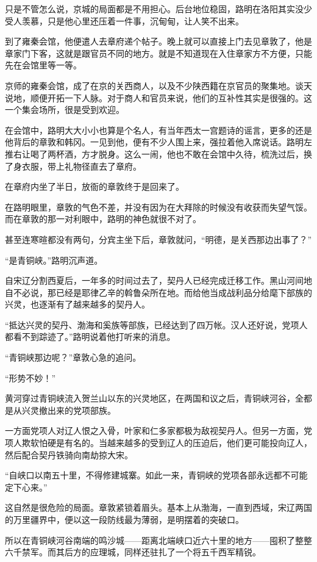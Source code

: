 只是不管怎么说，京城的局面都是不用担心。后台地位稳固，路明在洛阳其实没少受人羡慕，只是他心里还压着一件事，沉甸甸，让人笑不出来。 

到了雍秦会馆，他便遣人去章府递个帖子。晚上就可以直接上门去见章敦了，他是章家门下客，这就是跟官员不同的地方。就是不知道现在入住章家方不方便，只能先在会馆里等一等。 

京师的雍秦会馆，成了在京的关西商人，以及不少陕西籍在京官员的聚集地。谈天说地，顺便开拓一下人脉。对于商人和官员来说，他们的互补性其实是很强的。这一个集会场所，很是受到欢迎。 

在会馆中，路明大大小小也算是个名人，有当年西太一宫题诗的谣言，更多的还是他背后的章敦和韩冈。一见到他，便有不少人围上来，强拉着他入席说话。路明左推右让喝了两杯酒，方才脱身。这么一闹，他也不敢在会馆中久待，梳洗过后，换了身衣服，带上礼物径直去了章府。 

在章府内坐了半日，放衙的章敦终于是回来了。 

在路明眼里，章敦的气色不差，并没有因为在大拜除的时候没有收获而失望气馁。而在章敦的那一对利眼中，路明的神色就很不对了。 

甚至连寒暄都没有两句，分宾主坐下后，章敦就问，“明德，是关西那边出事了？” 

“是青铜峡。”路明沉声道。 

自宋辽分割西夏后，一年多的时间过去了，契丹人已经完成迁移工作。黑山河间地自不必说，那已经是耶律乙辛的斡鲁朵所在地。而给他当成战利品分给麾下部族的兴灵，也逐渐有了越来越多的契丹人。 

“抵达兴灵的契丹、渤海和奚族等部族，已经达到了四万帐。汉人还好说，党项人都看不到踪迹了。”路明说着他打听来的消息。 

“青铜峡那边呢？”章敦心急的追问。 

“形势不妙！” 

黄河穿过青铜峡流入贺兰山以东的兴灵地区，在两国和议之后，青铜峡河谷，全都是从兴灵撤出来的党项部族。 

一方面党项人对辽人恨之入骨，叶家和仁多家都极为敌视契丹人。但另一方面，党项人欺软怕硬是有名的。当越来越多的受到辽人的压迫后，他们更可能投向辽人，然后配合契丹铁骑向南劫掠大宋。 

“自峡口以南五十里，不得修建城寨。如此一来，青铜峡的党项各部永远都不可能定下心来。” 

这自然是很危险的局面。章敦紧锁着眉头。基本上从渤海，一直到西域，宋辽两国的万里疆界中，便以这一段防线最为薄弱，是明摆着的突破口。 

所以在青铜峡河谷南端的鸣沙城——距离北端峡口近六十里的地方——囤积了整整六千禁军。而其后方的应理城，同样还驻扎了一个将五千西军精锐。 

